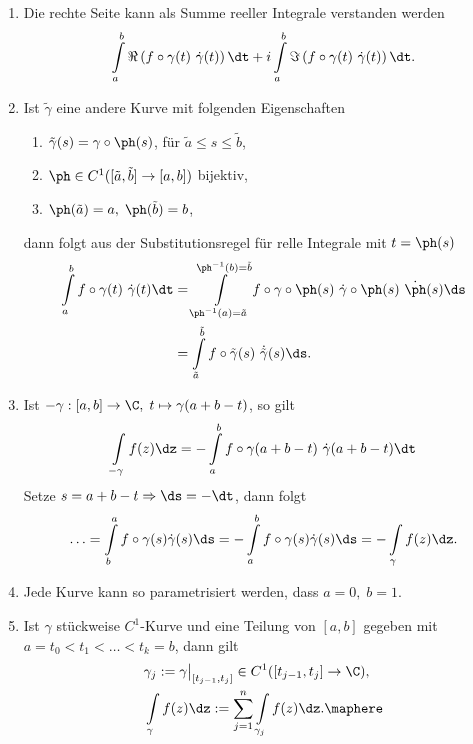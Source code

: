 \begin{bem}[Bemerkungen]
\label{bem:2.12}
\begin{enumerate}[label=\arabic{*}.)]
  \item Die rechte Seite kann als Summe reeller Integrale verstanden werden
  \begin{align*}
  \int\limits_a^b \Re \left(f\circ\gamma(t)\ \dot{\gamma}(t) \right)\dt + i 
  \int\limits_a^b \Im \left(f\circ\gamma(t)\ \dot{\gamma}(t) \right)\dt. 
  \end{align*}
  \item Ist $\tilde{\gamma}$ eine andere Kurve mit folgenden Eigenschaften
  \begin{enumerate}
    \item $\tilde{\gamma}(s) = \gamma\circ\ph(s)$, für $\tilde{a}\le s\le
    \tilde{b}$,
    \item $\ph\in C^1([\tilde{a},\tilde{b}]\to[a,b])$ bijektiv,
    \item $\ph(\tilde{a}) = a,\;\ph(\tilde{b}) = b$,
    \end{enumerate}
      dann folgt aus der Substitutionsregel für relle
    Integrale mit $t=\ph(s)$
    \begin{align*}
    \int\limits_a^b f\circ\gamma(t)\ \dot{\gamma}(t)\dt
    &= \int\limits_{\ph^{-1}(a) = \tilde{a}}^{\ph^{-1}(b) = \tilde{b}}
    f\circ\gamma\circ\ph(s)\ \dot{\gamma}\circ\ph(s)\ \dot{\ph}(s)\ds\\
    &= \int\limits_{\tilde{a}}^{\tilde{b}}
    f\circ\tilde{\gamma}(s)\ \dot{\tilde{\gamma}}(s)\ds.
    \end{align*}
  \item Ist $-\gamma: [a,b]\to \C,\;t\mapsto \gamma(a+b-t)$, so gilt
  \begin{align*}
  \int\limits_{-\gamma} f(z)\dz = -\int\limits_a^b
  f\circ\gamma(a+b-t)\ \dot{\gamma}(a+b-t)\dt
  \end{align*}
Setze $s=a+b-t \Rightarrow \ds = -\dt$, dann folgt
\begin{align*}
\ldots = \int\limits_b^a f\circ\gamma(s)\dot{\gamma}(s)\ds = -\int\limits_a^b
f\circ\gamma(s)\dot{\gamma}(s)\ds = -\int\limits_{\gamma}f(z)\dz.
\end{align*}
  \item Jede Kurve kann so parametrisiert werden, dass $a=0,\;b=1$.
  \item Ist $\gamma$ stückweise $C^1$-Kurve und eine Teilung von $[a,b]$ gegeben
  mit $a = t_0 < t_1 < \ldots < t_k = b$, dann gilt
  \begin{align*}
  &\gamma_j := \gamma\big|_{[t_{j-1},t_j]} \in C^1([t_{j-1},t_j]\to\C),\\
  &\int\limits_{\gamma} f(z)\dz := \sum\limits_{j=1}^n \int\limits_{\gamma_j}
  f(z)\dz.\maphere
  \end{align*}
\end{enumerate}
\end{bem}

